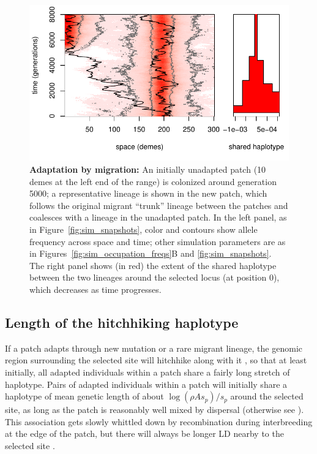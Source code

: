 \documentclass{article}
\newcommand{\citep}[1]{\cite{#1}}
\newcommand{\citet}[1]{\cite{#1}}
\begin{document}
\begin{figure}[ht]
  \begin{center}
      \includegraphics{sim-transit}
  \end{center}
  \caption{
  \textbf{Adaptation by migration:}
  An initially unadapted patch (10 demes at the left end of the range) is colonized around generation 5000;
  a representative lineage is shown in the new patch, which follows the original migrant ``trunk'' lineage
  between the patches and coalesces with a lineage in the unadapted patch.
  In the left panel, as in Figure~\ref{fig:sim_snapshots}, color and contours show allele frequency across space and time;
  other simulation parameters are as in Figures~\ref{fig:sim_occupation_freqs}B and \ref{fig:sim_snapshots}.
  The right panel shows (in red) the extent of the shared haplotype between the two lineages around the selected locus (at position 0),
  which decreases as time progresses. 
  \label{fig:lineagesmotion}
  }
\end{figure}




\subsection[Haplotypes Shared Between Patches]{Length of the hitchhiking haplotype}
\label{ss:haplotype_length}


If a patch adapts through new mutation or a rare migrant lineage, the
genomic region surrounding the selected site will hitchhike along with it \citep{maynardsmith1974hitchhiking},
so that at least initially, all adapted individuals within a patch
share a fairly long stretch of haplotype. 
Pairs of adapted individuals within a patch will initially share a haplotype of mean genetic length of
about $\log(\rho A s_p)/s_p$ around the selected site, 
as long as the patch is reasonably well mixed by dispersal
(otherwise see \citet{barton2013genetic}).
This association gets slowly whittled down by recombination during interbreeding at the edge of the patch,
but there will always be longer LD nearby to the selected site \citep{barton1979geneflow}.
\end{document}
